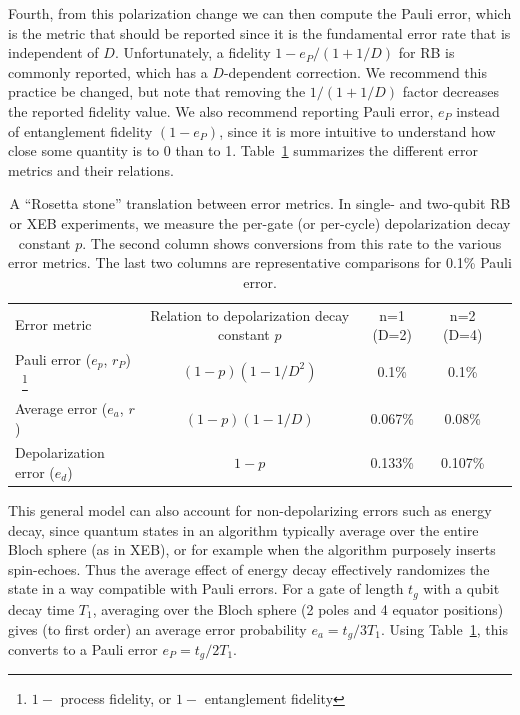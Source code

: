 Fourth, from this polarization change we can then compute the Pauli error, which is the metric that should be reported since it is the fundamental error rate that is independent of $D$.  Unfortunately, a fidelity $1-e_P/(1+1/D)$ for RB is commonly reported, which has a $D$-dependent correction.  We recommend this practice be changed, but note that removing the $1/(1+1/D)$ factor decreases the reported fidelity value.  We also recommend reporting Pauli error, $e_P$ instead of entanglement fidelity $(1-e_P)$, since it is more intuitive to understand how close some quantity is to 0 than to 1. Table~\ref{table:error} summarizes the different error metrics and their relations.

\begin{table}[t]
\caption{\label{table:error}
 A “Rosetta stone” translation between error metrics. In single- and two-qubit RB or XEB experiments, we measure the per-gate (or per-cycle) depolarization decay constant $p$. The second column shows conversions from this rate to the various error metrics. The last two columns are representative comparisons for 0.1\% Pauli error. 
}
\begin{ruledtabular}
\begin{tabular}{lcccc}
\textrm{Error metric}&
\textrm{Relation to depolarization decay constant $p$}&
\textrm{n=1 (D=2)}&
\textrm{n=2 (D=4)}\\
\colrule
Pauli error ($e_p$, $r_P$) ~\footnote{$1 - $ process fidelity, or $1 - $ entanglement fidelity}
 & $(1 - p) (1 - 1 / D^2)$ & 0.1\% & 0.1\% \\
Average error ($e_a$, $r$)
 & $(1 - p) (1 - 1 / D) $ & 0.067\% & 0.08\%\\
Depolarization error ($e_d$)
 & $1 - p$ & 0.133\% & 0.107\% \\
\end{tabular}
\end{ruledtabular}
\end{table}

This general model can also account for non-depolarizing errors such as energy decay, since quantum states in an algorithm typically average over the entire Bloch sphere (as in XEB), or for example when the algorithm purposely inserts spin-echoes.  Thus the average effect of energy decay effectively randomizes the state in a way compatible with Pauli errors.  For a gate of length $t_g$ with a qubit decay time $T_1$, averaging over the Bloch sphere (2 poles and 4 equator positions) gives (to first order) an average error probability $e_a = t_g/3T_1$.  Using Table~\ref{table:error}, this converts to a Pauli error $e_P=t_g/2T_1$.


